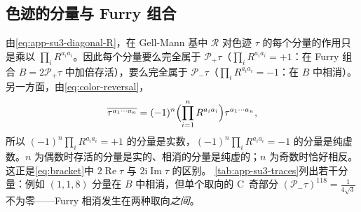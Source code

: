 \documentclass[UTF8,a4paper,11pt,fontset=fandol]{ctexart}
\theoremstyle{cplain}
\theoremstyle{cdefinition}
\theoremstyle{cremark}
\numberwithin{equation}{section}
\DeclareMathOperator{\Real}{Re}
\DeclareMathOperator{\Imag}{Im}
\newcommand{\Rop}{\mathcal{R}}                       %
\newcommand{\Pp}{\mathcal{P}_{+}}                    %
\newcommand{\Pm}{\mathcal{P}_{-}}                    %
\newcommand{\ii}{\mathrm{i}}                        %
\begin{document}
\subsection{色迹的分量与 Furry 组合}\label{sec:app-su3-traces}

由\cref{eq:app-su3-diagonal-R}，在 Gell-Mann 基中 $\Rop$ 对色迹 $\tau$ 的每个分量的作用只是乘以 $\prod_iR^{a_ia_i}$。因此每个分量要么完全属于 $\Pp\tau$（$\prod_iR^{a_ia_i}=+1$：在 Furry 组合 $B=2\Pp\tau$ 中加倍存活），要么完全属于 $\Pm\tau$（$\prod_iR^{a_ia_i}=-1$：在 $B$ 中相消）。另一方面，由\cref{eq:color-reversal}，
\begin{equation}\label{eq:app-su3-real-imag}
\overline{\tau^{a_1\cdots a_n}}=(-1)^n\Bigl(\prod_{i=1}^nR^{a_ia_i}\Bigr)\tau^{a_1\cdots a_n},
\end{equation}
所以 $(-1)^n\prod_iR^{a_ia_i}=+1$ 的分量是实数，$(-1)^n\prod_iR^{a_ia_i}=-1$ 的分量是纯虚数。$n$ 为偶数时存活的分量是实的、相消的分量是纯虚的；$n$ 为奇数时恰好相反。这正是\cref{eq:bracket}中 $2\Real\tau$ 与 $2\ii\Imag\tau$ 的区别。
\cref{tab:app-su3-traces}列出若干分量：例如 $(1,1,8)$ 分量在 $B$ 中相消，但单个取向的 C~奇部分 $(\Pm\tau)^{118}=\frac{1}{4\sqrt3}$ 不为零——Furry 相消发生在两种取向\emph{之间}。
\end{document}
